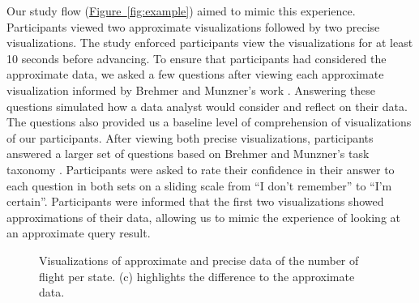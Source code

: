 \documentclass[10pt,journal,compsoc]{IEEEtran}
\newcommand{\figref}[1]{\hyperref[#1]{Figure~\ref*{#1}}}
\begin{document}
Our study flow (\figref{fig:example}) aimed to mimic this experience. %
Participants viewed two approximate visualizations followed by two precise visualizations.
The study enforced participants view the visualizations for at least 10 seconds before advancing. %
To ensure that participants had considered the approximate data, we asked a few questions after viewing each approximate visualization informed by Brehmer and Munzner's work \cite{brehmer2013multi}.
Answering these questions simulated how a data analyst would consider and reflect on their data.
The questions also provided us a baseline level of comprehension of visualizations of our participants.
After viewing both precise visualizations, participants answered a larger set of questions based on Brehmer and Munzner's task taxonomy \cite{brehmer2013multi}.
Participants were asked to rate their confidence in their answer to each question in both sets on a sliding scale from ``I don't remember'' to ``I'm certain''.
Participants were informed that the first two visualizations showed approximations of their data, allowing us to mimic the experience of looking at an approximate query result.

\begin{figure}[!ht]
\centering
{}
\hfil
{}
\hfil
{}
\caption{Visualizations of approximate and precise data of the number of flight per state. (c) highlights the difference to the approximate data.}
\label{fig:types}
\end{figure}
\end{document}
